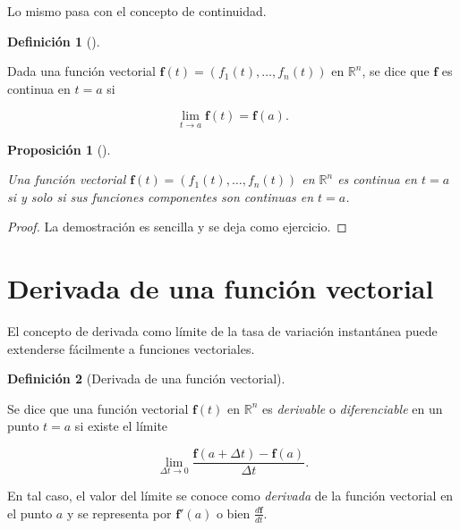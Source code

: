 \documentclass[
  a4paper,
]{scrreport}
\theoremstyle{definition}
\theoremstyle{plain}
\theoremstyle{definition}
\newtheorem{definition}{Definición}[chapter]
\theoremstyle{definition}
\theoremstyle{plain}
\theoremstyle{plain}
\newtheorem{proposition}{Proposición}[chapter]
\theoremstyle{remark}
\begin{document}
Lo mismo pasa con el concepto de continuidad.

\begin{definition}[]\protect\hypertarget{def-funcion-vectorial-continua}{}\label{def-funcion-vectorial-continua}

Dada una función vectorial \(\mathbf{f}(t)=(f_1(t),\ldots,f_n(t))\) en
\(\mathbb{R}^n\), se dice que \(\mathbf{f}\) es continua en \(t=a\) si

\[
\lim_{t\to a} \mathbf{f}(t) = \mathbf{f}(a).
\]

\end{definition}

\begin{proposition}[]\protect\hypertarget{prp-funcion-vectorial-continua}{}\label{prp-funcion-vectorial-continua}

Una función vectorial \(\mathbf{f}(t)=(f_1(t),\ldots,f_n(t))\) en
\(\mathbb{R}^n\) es continua en \(t=a\) si y solo si sus funciones
componentes son continuas en \(t=a\).

\end{proposition}

\begin{tcolorbox}[enhanced jigsaw, leftrule=.75mm, colbacktitle=quarto-callout-note-color!10!white, toprule=.15mm, opacityback=0, opacitybacktitle=0.6, toptitle=1mm, breakable, bottomtitle=1mm, colframe=quarto-callout-note-color-frame, rightrule=.15mm, titlerule=0mm, title=\textcolor{quarto-callout-note-color}{\faInfo}\hspace{0.5em}{Demostración}, arc=.35mm, left=2mm, bottomrule=.15mm, colback=white, coltitle=black]

\begin{proof}
La demostración es sencilla y se deja como ejercicio.
\end{proof}

\end{tcolorbox}

\section{Derivada de una función
vectorial}\label{derivada-de-una-funciuxf3n-vectorial}

El concepto de derivada como límite de la tasa de variación instantánea
puede extenderse fácilmente a funciones vectoriales.

\begin{definition}[Derivada de una función
vectorial]\protect\hypertarget{def-derivada-funcion-vectorial}{}\label{def-derivada-funcion-vectorial}

Se dice que una función vectorial \(\mathbf{f}(t)\) en \(\mathbb{R}^n\)
es \emph{derivable} o \emph{diferenciable} en un punto \(t=a\) si existe
el límite

\[
\lim_{\Delta t\rightarrow 0} \frac{\mathbf{f}(a+\Delta t)-\mathbf{f}(a)}{\Delta t}.
\]

En tal caso, el valor del límite se conoce como \emph{derivada} de la
función vectorial en el punto \(a\) y se representa por
\(\mathbf{f}'(a)\) o bien \(\frac{d\mathbf{f}}{dt}\).

\end{definition}
\end{document}
